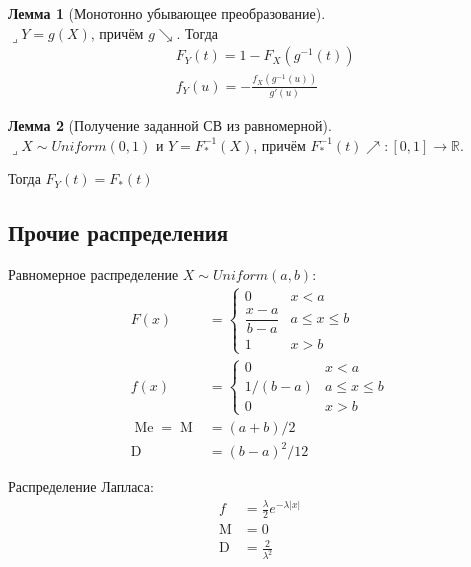 \documentclass[a4paper,12pt,fleqn]{article}
\newenvironment{onsamepage} {\begin{minipage}{\textwidth}} {\end{minipage}}
\numberwithin{figure}{section}
\theoremstyle{definition}
\newtheorem{lemma}{Лемма}[section]
\let\leqs\leqslant
\def\R{\mathbb{R}}
\DeclareMathOperator{\M}{M}
\DeclareMathOperator{\D}{D}
\DeclareMathOperator{\Me}{Me}
\def\lets{{\huge$\lrcorner$}\space}
\begin{document}
\begin{onsamepage}
\begin{lemma}[Монотонно убывающее преобразование] ~\\
	\lets $Y=g(X)$, причём $g \searrow$. Тогда
	\begin{align*}
	&	F_Y(t) = 1 - F_X \left( g^{-1}(t) \right)	\\
	&	f_Y(u) = - \frac{ f_X \left( g^{-1}(u) \right) }{ g'(u) }
	\end{align*}
\end{lemma}
\end{onsamepage}


\begin{lemma}[Получение заданной СВ из равномерной] ~\\
	\lets $X \sim Uniform(0,1)$ и $Y = F_{*}^{-1}(X)$,
	причём $F_{*}^{-1}(t) \nearrow : [0,1] \to \R$.

	Тогда $F_Y(t) = F_{*}(t)$
\end{lemma}


\subsection{Прочие распределения}

Равномерное распределение $X \sim Uniform(a,b)$:
\begin{align*}
	   F(x) &=
	   		\begin{cases}
	   			0	& x<a \\
		   		\dfrac{x-a}{b-a}	& a \leqs x \leqs b \\
		   		1	& x>b
			\end{cases}
	\\ f(x) &= \begin{cases}
				0		& x<a \\
				1/(b-a)	& a \leqs x \leqs b \\
				0		& x>b
			\end{cases}
	\\ \Me = \M &= (a+b)/2
	\\ \D &= (b-a)^2/12
\end{align*}


Распределение Лапласа:
\begin{align*}
	   f &= \frac{\lambda}2 e^{-\lambda|x|}
	\\ \M &= 0
	\\ \D &= \frac{2}{\lambda^2}
\end{align*}
\end{document}
